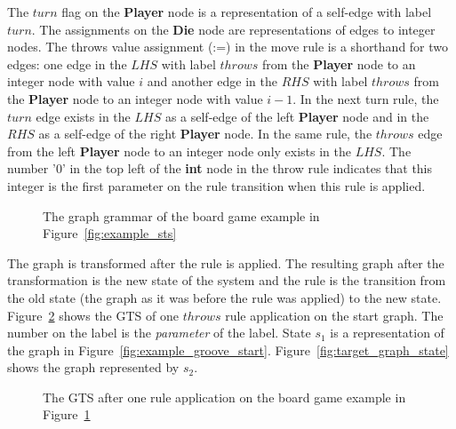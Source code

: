 The $turn$ flag on the \textbf{Player} node is a representation of a self-edge with label $turn$. The assignments on the \textbf{Die} node are representations of edges to integer nodes. The throws value assignment (:=) in the move rule is a shorthand for two edges: one edge in the $\mathit{LHS}$ with label $throws$ from the \textbf{Player} node to an integer node with value $i$ and another edge in the $\mathit{RHS}$ with label $throws$ from the \textbf{Player} node to an integer node with value $i-1$. In the next turn rule, the $turn$ edge exists in the $\mathit{LHS}$ as a self-edge of the left \textbf{Player} node and in the $\mathit{RHS}$ as a self-edge of the right \textbf{Player} node. In the same rule, the $throws$ edge from the left \textbf{Player} node to an integer node only exists in the $\mathit{LHS}$. The number '0' in the top left of the \textbf{int} node in the throw rule indicates that this integer is the first parameter on the rule transition when this rule is applied. 

\begin{figure}[h!]
  \begin{center}
    \quad
  \end{center}
  \caption{The graph grammar of the board game example in Figure~\ref{fig:example_sts}}
  \label{fig:example_groove}
\end{figure}

The graph is transformed after the rule is applied. The resulting graph after the transformation is the new state of the system and the rule is the transition from the old state (the graph as it was before the rule was applied) to the new state. Figure~\ref{fig:gts_example} shows the GTS of one $throws$ rule application on the start graph. The number on the label is the \textit{parameter} of the label. State $s_1$ is a representation of the graph in Figure~\ref{fig:example_groove_start}. Figure~\ref{fig:target_graph_state} shows the graph represented by $s_2$.

\begin{figure}[h!]
  \begin{center}
    
  \end{center}
  \caption{The GTS after one rule application on the board game example in Figure~\ref{fig:example_groove}}
  \label{fig:gts_example}
\end{figure}

